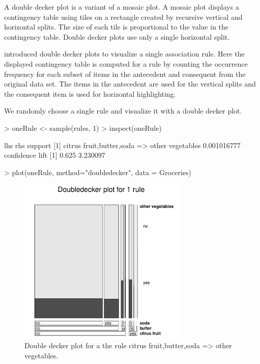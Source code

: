 \documentclass[nojss]{jss}
\begin{document}
A double decker plot is a variant of a mosaic plot.  A mosaic plot
displays a contingency table using tiles on a rectangle created by recursive
vertical and horizontal splits. The size of each tile is proportional to the
value in the contingency table. Double decker plots use
only a single horizontal split.

\cite{arulesViz:Hofmann:2000} introduced
double decker plots to visualize a single association rule.
Here the displayed contingency table is computed for a rule by counting
the occurrence frequency for each subset of items in the antecedent and
consequent from the original data set.
The items in the antecedent are used for the vertical splits
and the consequent item is used for horizontal highlighting.

We randomly choose a single rule and visualize it with a double decker plot.
\begin{Schunk}
\begin{Sinput}
> oneRule <- sample(rules, 1)
> inspect(oneRule)
\end{Sinput}
\begin{Soutput}
    lhs                           rhs                support    
[1] {citrus fruit,butter,soda} => {other vegetables} 0.001016777
    confidence lift    
[1] 0.625      3.230097
\end{Soutput}
\end{Schunk}

\begin{Schunk}
\begin{Sinput}
> plot(oneRule, method="doubledecker", data = Groceries)
\end{Sinput}
\end{Schunk}
\begin{figure}
\centering
\includegraphics[width=8cm]{arulesViz-doubledecker1}
\caption{Double decker plot for a the rule
{citrus fruit,butter,soda} => {other vegetables}.\label{fig:doubledecker1}}
\end{figure}
\end{document}
